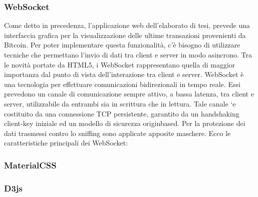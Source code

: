 \subsubsection{WebSocket}
\label{sec:WebSocket}
Come detto in precedenza, l'applicazione web dell'elaborato di tesi, prevede una interfaccia grafica per la visualizzazione delle ultime transazioni provenienti da Bitcoin. Per poter implementare questa funzionalità, c'è bisogno di utilizzare tecniche che permettano l'invio di dati tra client e server in modo asincrono. 
Tra le novità portate da HTML5, i WebSocket rappresentano quella di maggior importanza dal punto di vista dell’interazione tra client e server. WebSocket è una tecnologia per effettuare comunicazioni bidirezionali in tempo reale. Essi prevedono un canale di comunicazione sempre attivo, a bassa latenza, tra client e server, utilizzabile da entrambi sia in scrittura che in lettura. Tale canale `e costituito da una connessione TCP persistente, garantito da un handshaking client-key iniziale ed un modello di sicurezza originbased. Per la protezione dei dati trasmessi contro lo sniffing sono applicate apposite maschere. Ecco le caratteristiche principali dei WebSocket:

\subsubsection{MaterialCSS}
\label{sec:materialCSS}

\subsubsection{D3js}
\label{sec:d3js}